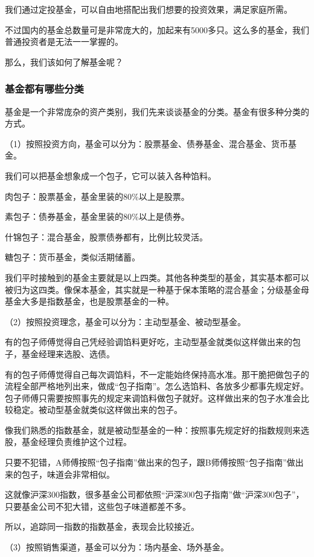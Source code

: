 我们通过定投基金，可以自由地搭配出我们想要的投资效果，满足家庭所需。

不过国内的基金总数量可是非常庞大的，加起来有5000多只。这么多的基金，我们普通投资者是无法一一掌握的。

那么，我们该如何了解基金呢？

\subsubsection{基金都有哪些分类}

基金是一个非常庞杂的资产类别，我们先来谈谈基金的分类。基金有很多种分类的方式。

（1）按照投资方向，基金可以分为：股票基金、债券基金、混合基金、货币基金。

我们可以把基金想象成一个包子，它可以装入各种馅料。

{\kaishu 肉包子：股票基金，基金里装的80\%以上是股票。}

{\kaishu 素包子：债券基金，基金里装的80\%以上是债券。}

{\kaishu 什锦包子：混合基金，股票债券都有，比例比较灵活。}

{\kaishu 糖包子：货币基金，类似活期储蓄。}

我们平时接触到的基金主要就是以上四类。其他各种类型的基金，其实基本都可以被归为这四类。像保本基金，其实就是一种基于保本策略的混合基金；分级基金母基金大多是指数基金，也是股票基金的一种。

（2）按照投资理念，基金可以分为：主动型基金、被动型基金。

有的包子师傅觉得自己凭经验调馅料更好吃，主动型基金就类似这样做出来的包子，基金经理来选股、选债。

有的包子师傅觉得自己每次调馅料，不一定能始终保持高水准。那干脆把做包子的流程全部严格地列出来，做成“包子指南”。怎么选馅料、各放多少都事先规定好。包子师傅只需要按照事先的规定来调馅料做包子就好。这样做出来的包子水准会比较稳定。被动型基金就类似这样做出来的包子。

像我们熟悉的指数基金，就是被动型基金的一种：按照事先规定好的指数规则来选股，基金经理负责维护这个过程。

只要不犯错，A师傅按照“包子指南”做出来的包子，跟B师傅按照“包子指南”做出来的包子，味道会非常相似。

这就像沪深300指数，很多基金公司都依照“沪深300包子指南”做“沪深300包子”，只要基金公司不犯大错，这些包子味道都差不多。

所以，追踪同一指数的指数基金，表现会比较接近。

（3）按照销售渠道，基金可以分为：场内基金、场外基金。

